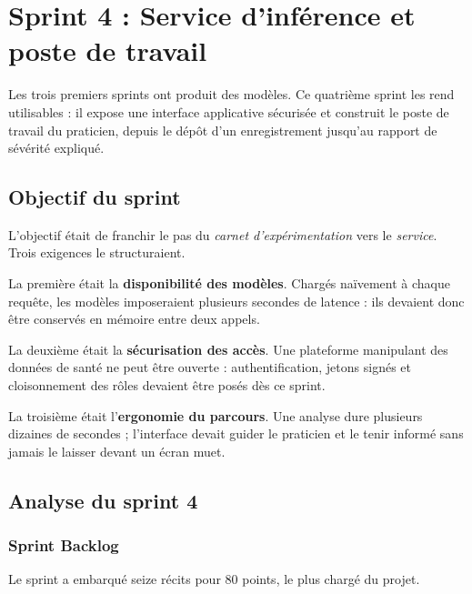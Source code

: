\chapter{Sprint 4 : Service d'inférence et poste de travail}
\label{chap:sprint4}


Les trois premiers sprints ont produit des modèles. Ce quatrième sprint les rend
utilisables : il expose une interface applicative sécurisée et construit le poste de
travail du praticien, depuis le dépôt d'un enregistrement jusqu'au rapport de sévérité
expliqué.

\section{Objectif du sprint}

L'objectif était de franchir le pas du \emph{carnet d'expérimentation} vers le
\emph{service}. Trois exigences le structuraient.

La première était la \textbf{disponibilité des modèles}. Chargés naïvement à chaque
requête, les modèles imposeraient plusieurs secondes de latence : ils devaient donc être
conservés en mémoire entre deux appels.

La deuxième était la \textbf{sécurisation des accès}. Une plateforme manipulant des
données de santé ne peut être ouverte : authentification, jetons signés et cloisonnement
des rôles devaient être posés dès ce sprint.

La troisième était l'\textbf{ergonomie du parcours}. Une analyse dure plusieurs dizaines
de secondes ; l'interface devait guider le praticien et le tenir informé sans jamais le
laisser devant un écran muet.

\section{Analyse du sprint 4}

\subsection{Sprint Backlog}

Le sprint a embarqué seize récits pour 80 points, le plus chargé du projet.

